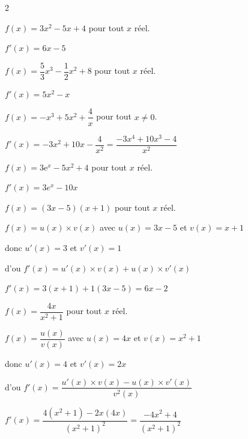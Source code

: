 \documentclass[11pt,a4paper]{article}  %
\begin{document}
\begin{multicols}{2}
	\begin{enumMet}
	\item $f(x)=3 x^2-5 x+4$ pour tout $x$ réel.
	\begin{corrBox}
		$f'(x)=6x-5$		
	\end{corrBox}
	\item $f(x)=\dfrac{5}{3} x^3-\dfrac{1}{2} x^2+8$ pour tout $x$ réel.
	\begin{corrBox}
		$f'(x)=5x^2-x$		
	\end{corrBox}
	\item $f(x)=-x^3+5 x^2+\dfrac{4}{x}$ pour tout $x \neq 0$.
	\begin{corrBox}
		$f'(x)=-3x^2+10x-\dfrac{4}{x^2}=\dfrac{-3x^4+10x^3-4}{x^2}$		
	\end{corrBox}
	\item $f(x)=3 \mathrm{e}^x-5 x^2+4$ pour tout $x$ réel.
	\begin{corrBox}
		$f'(x)=3e^x-10x$		
	\end{corrBox}
	\item $f(x)=(3 x-5)(x+1)$ pour tout $x$ réel.
	\begin{corrBox}
		$f(x)=u(x)\times v(x)$ avec $u(x)=3x-5$ et $v(x)=x+1$
		
		donc $u'(x)=3$ et $v'(x)=1$
		
		d'ou $f'(x)=u'(x)\times v(x)+u(x)\times v'(x)$
		
		$f'(x)=3(x+1)+1(3x-5)=6x-2$		
	\end{corrBox}
	\item $f(x)=\dfrac{4 x}{x^2+1}$ pour tout $x$ réel.
	\begin{corrBox}
		$f(x)=\dfrac{u(x)}{v(x)}$ avec $u(x)=4x$ et $v(x)=x^2+1$
		
		donc $u'(x)=4$ et $v'(x)=2x$
		
		d'ou $f'(x)=\dfrac{u'(x)\times v(x)-u(x)\times v'(x)}{v^2(x)}$
		
		$f'(x)=\dfrac{4(x^2+1)-2x(4x)}{(x^2+1)^2}=\dfrac{-4x^2+4}{(x^2+1)^2}$	
	\end{corrBox}
\end{enumMet}
\end{multicols}

\newpage
\end{document}
